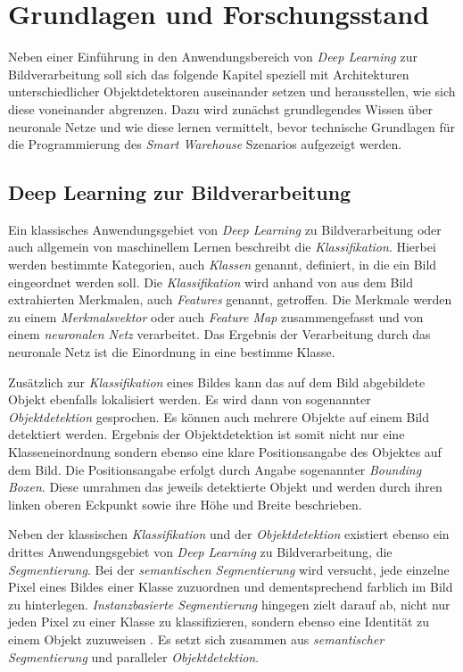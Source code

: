 \chapter{Grundlagen und Forschungsstand}

Neben einer Einführung in den Anwendungsbereich von \textit{Deep Learning} zur Bildverarbeitung soll sich das folgende Kapitel speziell mit Architekturen unterschiedlicher Objektdetektoren auseinander setzen und herausstellen, wie sich diese voneinander abgrenzen. Dazu wird zunächst grundlegendes Wissen über neuronale Netze und wie diese \glqq lernen\grqq{} vermittelt, bevor technische Grundlagen für die Programmierung des \textit{Smart Warehouse} Szenarios aufgezeigt werden.

\section{Deep Learning zur Bildverarbeitung}

Ein klassisches Anwendungsgebiet von \textit{Deep Learning} zu Bildverarbeitung oder auch allgemein von maschinellem Lernen beschreibt die \textit{Klassifikation}. Hierbei werden bestimmte Kategorien, auch \textit{Klassen} genannt, definiert, in die ein Bild eingeordnet werden soll. Die \textit{Klassifikation} wird anhand von aus dem Bild extrahierten Merkmalen, auch \textit{Features} genannt, getroffen. Die Merkmale werden zu einem \textit{Merkmalsvektor} oder auch \textit{Feature Map} zusammengefasst und von einem \textit{neuronalen Netz} verarbeitet. Das Ergebnis der Verarbeitung durch das neuronale Netz ist die Einordnung in eine bestimme Klasse. 

Zusätzlich zur \textit{Klassifikation} eines Bildes kann das auf dem Bild abgebildete Objekt ebenfalls lokalisiert werden. Es wird dann von sogenannter \textit{Objektdetektion} gesprochen. Es können auch mehrere Objekte auf einem Bild detektiert werden. Ergebnis der Objektdetektion ist somit nicht nur eine Klasseneinordnung sondern ebenso eine klare Positionsangabe des Objektes auf dem Bild. Die Positionsangabe erfolgt durch Angabe sogenannter \textit{Bounding Boxen}. Diese umrahmen das jeweils detektierte Objekt und werden durch ihren linken oberen Eckpunkt sowie ihre Höhe und Breite beschrieben. 

Neben der klassischen \textit{Klassifikation} und der \textit{Objektdetektion} existiert ebenso ein drittes Anwendungsgebiet von \textit{Deep Learning} zu Bildverarbeitung, die \textit{Segmentierung}. Bei der \textit{semantischen Segmentierung} wird versucht, jede einzelne Pixel eines Bildes einer Klasse zuzuordnen und dementsprechend farblich im Bild zu hinterlegen. \textit{Instanzbasierte Segmentierung} hingegen zielt darauf ab, nicht nur jeden Pixel zu einer Klasse zu klassifizieren, sondern ebenso eine Identität zu einem Objekt zuzuweisen \cite{RavindraParmar.20180902}. Es setzt sich zusammen aus \textit{semantischer Segmentierung} und paralleler \textit{Objektdetektion}.

